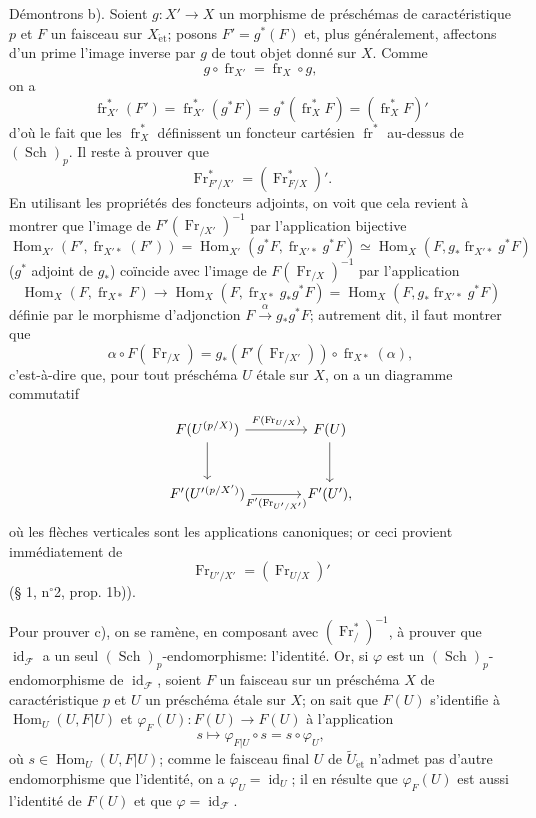 \documentclass[11pt]{article}
\DeclareMathOperator{\Hom}{Hom}
\providecommand{\et}{\mathrm{\acute{e}t}}
\providecommand{\id}{\operatorname{id}}
\providecommand{\Hom}{\operatorname{Hom}}
\providecommand{\id}{\operatorname{id}}
\providecommand{\id}{\operatorname{id}}
\providecommand{\id}{\operatorname{id}}
\providecommand{\id}{\operatorname{id}}
\providecommand{\Hom}{\operatorname{Hom}}
\providecommand{\fr}{\operatorname{fr}}
\providecommand{\Fr}{\operatorname{Fr}}
\providecommand{\Sch}{\operatorname{Sch}}
\providecommand{\Fr}{\operatorname{Fr}}
\providecommand{\fr}{\operatorname{fr}}
\providecommand{\Sch}{\operatorname{Sch}}
\providecommand{\id}{\operatorname{id}}
\providecommand{\et}{\acute{e}t}
\begin{document}
Démontrons b). Soient $g:X'\to X$ un morphisme de préschémas de caractéristique $p$ et $F$ un faisceau sur $X_{\et}$; posons $F'=g^*(F)$ et, plus généralement, affectons d'un prime l'image inverse par $g$ de tout objet donné sur $X$. Comme
\[
g\circ\fr_{X'}=\fr_X\circ g,
\]
on a
\[
\fr_{X'}^*(F')=\fr_{X'}^*(g^*F)=g^*(\fr_X^*F)=(\fr_X^*F)'
\]
d'où le fait que les $\fr_X^*$ définissent un foncteur cartésien $\fr^*$ au-dessus de $(\Sch)_p$. Il reste à prouver que
\[
\Fr^*_{F'/X'}=(\Fr^*_{F/X})'.
\]
En utilisant les propriétés des foncteurs adjoints, on voit que cela revient à montrer que l'image de $F'(\Fr_{/X'})^{-1}$ par l'application bijective
\[
\Hom_{X'}(F',\fr_{X'*}(F'))
 =\Hom_{X'}(g^*F,\fr_{X'*}g^*F)
 \simeq \Hom_X(F,g_*\fr_{X'*}g^*F)
\]
($g^*$ adjoint de $g_*$) coïncide avec l'image de $F(\Fr_{/X})^{-1}$ par l'application
\[
\Hom_X(F,\fr_{X*}F)\longrightarrow
\Hom_X(F,\fr_{X*}g_*g^*F)=
\Hom_X(F,g_*\fr_{X'*}g^*F)
\]
définie par le morphisme d'adjonction $F\xrightarrow{\alpha} g_*g^*F$; autrement dit, il faut montrer que
\[
\alpha\circ F(\Fr_{/X})=g_*(F'(\Fr_{/X'}))\circ\fr_{X*}(\alpha),
\]
c'est-à-dire que, pour tout préschéma $U$ étale sur $X$, on a un diagramme commutatif%
\[
\begin{tikzcd}[column sep=large,row sep=large]
F(U^{(p/X)}) \arrow[r,"F(\Fr_{U/X})"] \arrow[d]
& F(U) \arrow[d]\\
F'(U'{}^{(p/X')}) \arrow[r,"F'(\Fr_{U'/X'})"']
& F'(U') ,
\end{tikzcd}
\]
où les flèches verticales sont les applications canoniques; or ceci provient immédiatement de
\[
\Fr_{U'/X'}=(\Fr_{U/X})'
\]
(§ 1, n$^\circ$2, prop. 1b)).

Pour prouver c), on se ramène, en composant avec $(\Fr^*_{/})^{-1}$, à prouver que $\id_{\mathcal F}$ a un seul $(\Sch)_p$-endomorphisme: l'identité. Or, si $\varphi$ est un $(\Sch)_p$-endomorphisme de $\id_{\mathcal F}$, soient $F$ un faisceau sur un préschéma $X$ de caractéristique $p$ et $U$ un préschéma étale sur $X$; on sait que $F(U)$ s'identifie à $\Hom_U(U,F|U)$ et $\varphi_F(U):F(U)\to F(U)$ à l'application
\[
s\longmapsto \varphi_{F|U}\circ s=s\circ\varphi_U,
\]
où $s\in\Hom_U(U,F|U)$; comme le faisceau final $U$ de $\widetilde U_{\et}$ n'admet pas d'autre endomorphisme que l'identité, on a $\varphi_U=\id_U$; il en résulte que $\varphi_F(U)$ est aussi l'identité de $F(U)$ et que $\varphi=\id_{\mathcal F}$.
\end{document}
